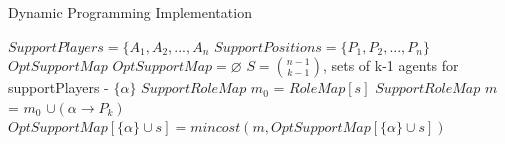 \begin{algorithm}[t!]
\caption{Dynamic Programming Implementation}
\label{alg3}
\begin{algorithmic}[1]
$SupportPlayers = \lbrace A_{1},A_{2},...,A_{n} $
\STATE $SupportPositions = \lbrace P_{1},P_{2},...,P_{n} \rbrace $
$OptSupportMap$
\STATE $OptSupportMap = \varnothing $
\STATE $ S = {{n-1}\choose{k-1}} $, sets of k-1 agents for supportPlayers - $\lbrace \alpha \rbrace$
\STATE $SupportRoleMap$ $m_{0}$ = $RoleMap[s]$
\STATE $SupportRoleMap$ $m$ = $m_{0}$ $ \cup (\alpha \rightarrow P_{k})$
\STATE $OptSupportMap[\lbrace \alpha \rbrace \cup s] = mincost(m,OptSupportMap[\lbrace \alpha \rbrace \cup s])$
\ENDFOR
\ENDFOR
\ENDFOR
\end{algorithmic}
\end{algorithm}

